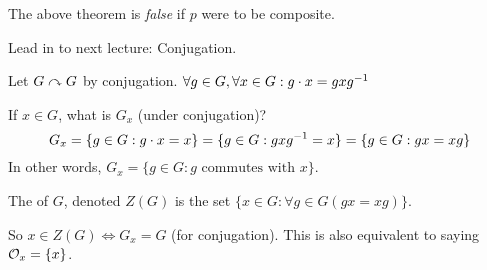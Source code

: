 \documentclass[notes.tex]{subfile}
\begin{document}
\begin{remark}
	The above theorem is \emph{false} if $p$ were to be composite.
\end{remark}

Lead in to next lecture: Conjugation.

Let $G\curvearrowright G$ by conjugation. $\forall g\in G, \forall x\in G: g\cdot x = gx{g}^{-1}$

If $x\in G$, what is $G_x$ (under conjugation)?
\[
	G_x 
	= \{g\in G : g\cdot x = x\} 
	= \{g\in G: gx{g}^{-1} = x\} 
	= \{g\in G:gx =xg\}
\]
In other words, $G_x = \{g\in G:g\text{ commutes with } x\}$.

\begin{defn}
	The  of $G$, denoted $Z(G)$ is the set $\{x\in G: \forall g\in G (gx = xg)\}$.
\end{defn}

So $x\in Z(G) \iff G_x = G$ (for conjugation). This is also equivalent to saying $\mathcal{O}_x = \{x\}$.
\end{document}
